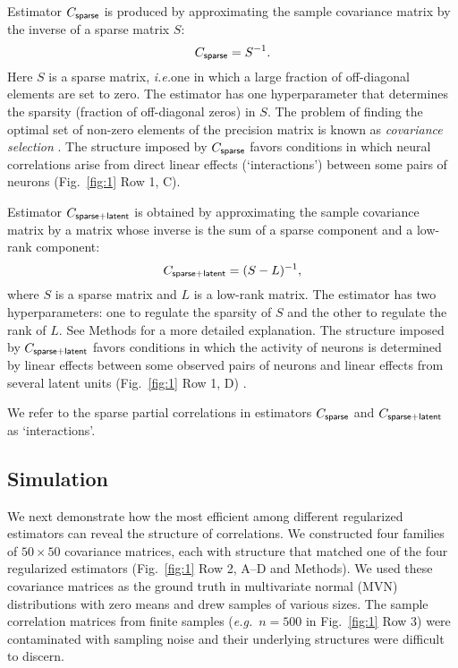 {Estimator $C_{\sf sparse}$ is produced by approximating the sample covariance matrix by the inverse of a sparse matrix $S$:
\begin{equation}\label{eq:c-sparse}
C_{\sf sparse} = S^{-1}.
\end{equation}
Here $S$ is a sparse matrix, \emph{i.e.}\;one in which a large fraction of off-diagonal elements are set to zero.  The estimator has one hyperparameter that determines the sparsity (fraction of off-diagonal zeros) in $S$. The problem of finding the optimal set of non-zero elements of the precision matrix is known as \emph{covariance selection} \cite{Dempster:1972}. The structure imposed by $C_{\sf sparse}$ favors conditions in which neural correlations arise from direct linear effects (`interactions') between some pairs of neurons (Fig.~\ref{fig:1}} Row 1, C).

Estimator $C_{\sf sparse+latent}$ is obtained by approximating the sample covariance matrix by a matrix whose inverse is the sum of a sparse component and a low-rank component:
\begin{equation}\label{eq:c-sl}
C_{\sf sparse+latent} = (S - L)^{-1},
\end{equation}
where $S$ is a sparse matrix and $L$ is a low-rank matrix. The estimator has two hyperparameters: one to regulate the sparsity of $S$ and the other to regulate the rank of $L$. See Methods for a more detailed explanation. The structure imposed by $C_{\sf sparse+latent}$ favors conditions in which the activity of neurons is determined by linear effects between some observed pairs of neurons and linear effects from several latent units (Fig.~\ref{fig:1} Row 1, D) \cite{Chandrasekaran:2010,Ma:2013}.

We refer to the sparse partial correlations in estimators $C_{\sf sparse}$ and $C_{\sf sparse+latent}$ as `interactions'.

\subsection*{Simulation}
We next demonstrate how the most efficient among different regularized estimators can reveal the structure of correlations.
We constructed four families of $50\times 50$ covariance matrices, each with structure that matched one of the four regularized estimators (Fig.~\ref{fig:1} Row 2, A--D and Methods).  We used these covariance matrices as the ground truth in multivariate normal (MVN) distributions with zero means and drew samples of various sizes. 
The sample correlation matrices from finite samples (\emph{e.g.}\ $n=500$ in Fig.~\ref{fig:1} Row 3) were contaminated with sampling noise and their underlying structures were difficult to discern.

